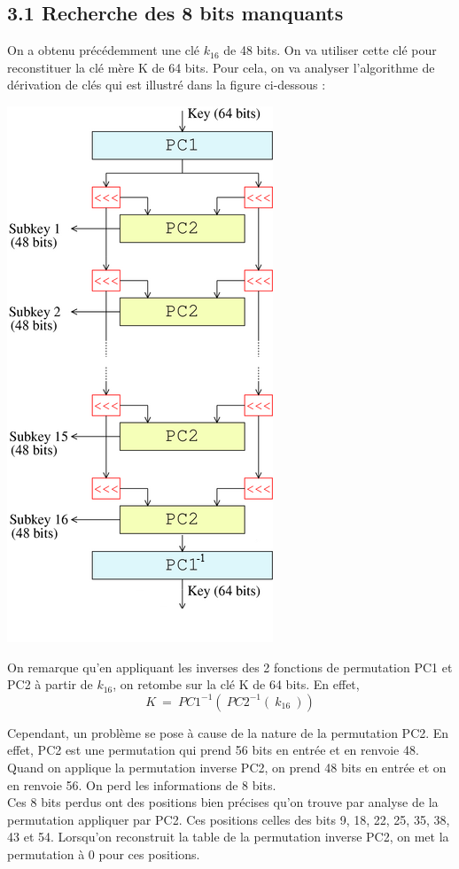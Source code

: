 		\subsection*{3.1 Recherche des 8 bits manquants}
			On a obtenu précédemment une clé $k_{16}$ de 48 bits. On va utiliser cette clé pour reconstituer la clé mère K de 64 bits. Pour cela, on va analyser l'algorithme de dérivation de clés qui est illustré dans la figure ci-dessous :
			\begin{center}\includegraphics[scale=0.5]{KEY.png}\end{center}
			
			On remarque qu'en appliquant les inverses des 2 fonctions de permutation PC1 et PC2 à partir de $k_{16}$, on retombe sur la clé K de 64 bits. En effet,
			\[K\ =\ PC1^{-1}(\ PC2^{-1}(\ k_{16}\ ))\]
			
			Cependant, un problème se pose à cause de la nature de la permutation PC2. En effet, PC2 est une permutation qui prend 56 bits en entrée et en renvoie 48. Quand on applique la permutation inverse PC2, on prend 48 bits en entrée et on en renvoie 56. On perd les informations de 8 bits.\\
			\indent Ces 8 bits perdus ont des positions bien précises qu'on trouve par analyse de la permutation appliquer par PC2. Ces positions celles des bits 9, 18, 22, 25, 35, 38, 43 et 54. Lorsqu'on reconstruit la table de la permutation inverse PC2, on met la permutation à 0 pour ces positions.
			
